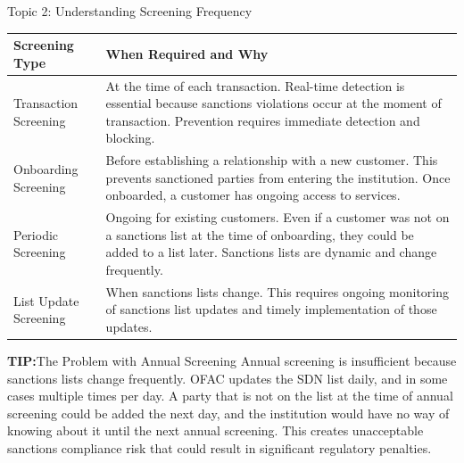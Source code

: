 \documentclass[5pt]{beamer}
\newcommand{\tip}{\textcolor{infoblue}{\textbf{TIP:}}}
\begin{document}
	\begin{frame}{Topic 2: Understanding Screening Frequency}
		\begin{center}
			\tiny
			\begin{tabular}{|p{2.5cm}|p{3.5cm}|}
				\hline
				\rowcolor{lightgray}
				\textbf{Screening Type} & \textbf{When Required and Why} \\
				\hline
				Transaction Screening & At the time of each transaction. Real-time detection is essential because sanctions violations occur at the moment of transaction. Prevention requires immediate detection and blocking. \\
				\hline
				Onboarding Screening & Before establishing a relationship with a new customer. This prevents sanctioned parties from entering the institution. Once onboarded, a customer has ongoing access to services. \\
				\hline
				Periodic Screening & Ongoing for existing customers. Even if a customer was not on a sanctions list at the time of onboarding, they could be added to a list later. Sanctions lists are dynamic and change frequently. \\
				\hline
				List Update Screening & When sanctions lists change. This requires ongoing monitoring of sanctions list updates and timely implementation of those updates. \\
				\hline
			\end{tabular}
		\end{center}
		
		\begin{alertblock}{\tiny \tip The Problem with Annual Screening}
			\tiny Annual screening is insufficient because sanctions lists change frequently. OFAC updates the SDN list daily, and in some cases multiple times per day. A party that is not on the list at the time of annual screening could be added the next day, and the institution would have no way of knowing about it until the next annual screening. This creates unacceptable sanctions compliance risk that could result in significant regulatory penalties.
		\end{alertblock}
	\end{frame}
	
\end{document}

